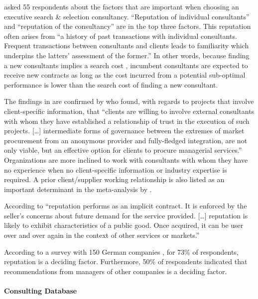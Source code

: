 \documentclass[12pt]{article}
\begin{document}
\citet[243-244]{clark1993} asked 55 respondents about the factors that
are important when choosing an executive search \& selection
consultancy. ``Reputation of individual consultants'' and ``reputation
of the consultancy'' are in the top three factors. This reputation often
arises from ``a history of past transactions with individual
consultants. Frequent transactions between consultants and clients leads
to familiarity which underpins the latters' assessment of the former.''
In other words, because finding a new consultants implies a search cost
\citep[ 1072]{wilson2012}, incumbent consultants are expected to receive
new contracts as long as the cost incurred from a potential sub-optimal
performance is lower than the search cost of finding a new consultant.

The findings in \citet{clark1993} are confirmed by
\citet[285]{richter2009} who found, with regards to projects that
involve client-specific information, that ``clients are willing to
involve external consultants with whom they have established a
relationship of trust in the execution of such projects. {[}\ldots{]}
intermediate forms of governance between the extremes of market
procurement from an anonymous provider and fully-fledged integration,
are not only viable, but an effective option for clients to procure
managerial services.'' Organizations are more inclined to work with
consultants with whom they have no experience when no client-specific
information or industry expertise is required. A prior client/supplier
working relationship is also listed as an important determinant in the
meta-analysis by \citet[235]{lacity2011}.

According to \citet[516]{nayyar1990} ``reputation performs as an
implicit contract. It is enforced by the seller's concerns about future
demand for the service provided. {[}\ldots{]} reputation is likely to
exhibit characteristics of a public good. Once acquired, it can be user
over and over again in the context of other services or markets.''

According to a survey with 150 German companies \citep[ 91]{kieser2006},
for 73\% of respondents, reputation is a deciding factor. Furthermore,
50\% of respondents indicated that recommendations from managers of
other companies is a deciding factor.

\paragraph{Consulting Database}\label{consulting-database}
\end{document}
